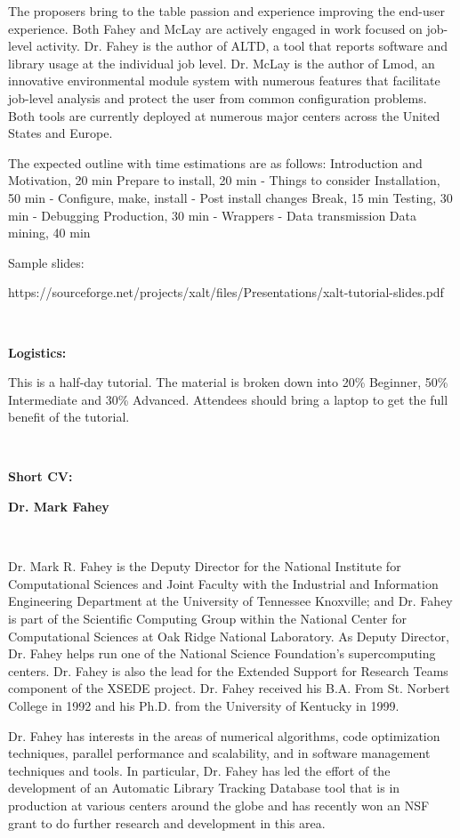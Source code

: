 \documentclass[12pt]{article}
\begin{document}
The proposers bring to the table passion and experience improving the
end-user experience. Both Fahey and McLay are actively engaged in work
focused on job-level activity. Dr. Fahey is the author of ALTD, a tool
that reports software and library usage at the individual job
level. Dr. McLay is the author of Lmod, an innovative environmental
module system with numerous features that facilitate job-level
analysis and protect the user from common configuration problems. Both
tools are currently deployed at numerous major centers across the
United States and Europe. 

The expected outline with time estimations are as follows:
Introduction and Motivation, 20 min Prepare to install, 20 min -
Things to consider Installation, 50 min - Configure, make, install -
Post install changes Break, 15 min Testing, 30 min - Debugging
Production, 30 min - Wrappers - Data transmission Data mining, 40 min 

\noindent
Sample slides:

https://sourceforge.net/projects/xalt/files/Presentations/xalt-tutorial-slides.pdf 

~~

\noindent
{\bf{}Logistics:}

This is a half-day tutorial.  The material is broken down into 20\%
Beginner, 50\% Intermediate and 30\% Advanced.   Attendees should
bring a laptop to get the full benefit of the tutorial.

~~

\noindent
{\bf{}Short CV:} 

\noindent
{\bf{}Dr. Mark Fahey}

~~

\noindent
Dr. Mark R. Fahey is the Deputy Director for the National Institute
for Computational Sciences and Joint Faculty with the Industrial and
Information Engineering Department at the University of Tennessee
Knoxville; and Dr. Fahey is part of the Scientific Computing Group
within the National Center for Computational Sciences at Oak Ridge
National Laboratory.  As Deputy Director, Dr. Fahey helps run one of
the National Science Foundation’s supercomputing centers.  Dr. Fahey
is also the lead for the Extended Support for Research Teams component
of the XSEDE project.  Dr. Fahey received his B.A. From St. Norbert
College in 1992 and his Ph.D. from the University of Kentucky in 1999.  

Dr. Fahey has interests in the areas of numerical algorithms, code
optimization techniques, parallel performance and scalability, and in
software management techniques and tools.  In particular, Dr. Fahey
has led the effort of the development of an Automatic Library Tracking
Database tool that is in production at various centers around the
globe and has recently won an NSF grant to do further research and
development in this area. 
\end{document}
